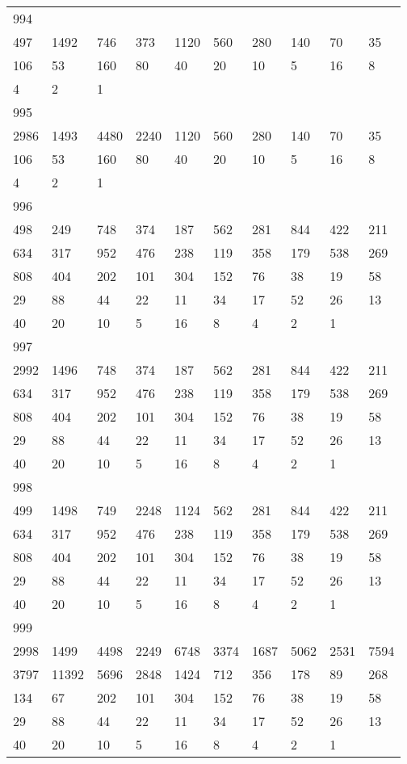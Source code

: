 \begin{longtable}{*{10}{l}}
994&&&&&&&&&\\
497& 1492& 746& 373& 1120& 560& 280& 140& 70& 35\\
106& 53& 160& 80& 40& 20& 10& 5& 16& 8\\
4& 2& 1& \\

995&&&&&&&&&\\
2986& 1493& 4480& 2240& 1120& 560& 280& 140& 70& 35\\
106& 53& 160& 80& 40& 20& 10& 5& 16& 8\\
4& 2& 1& \\

996&&&&&&&&&\\
498& 249& 748& 374& 187& 562& 281& 844& 422& 211\\
634& 317& 952& 476& 238& 119& 358& 179& 538& 269\\
808& 404& 202& 101& 304& 152& 76& 38& 19& 58\\
29& 88& 44& 22& 11& 34& 17& 52& 26& 13\\
40& 20& 10& 5& 16& 8& 4& 2& 1& \\

997&&&&&&&&&\\
2992& 1496& 748& 374& 187& 562& 281& 844& 422& 211\\
634& 317& 952& 476& 238& 119& 358& 179& 538& 269\\
808& 404& 202& 101& 304& 152& 76& 38& 19& 58\\
29& 88& 44& 22& 11& 34& 17& 52& 26& 13\\
40& 20& 10& 5& 16& 8& 4& 2& 1& \\

998&&&&&&&&&\\
499& 1498& 749& 2248& 1124& 562& 281& 844& 422& 211\\
634& 317& 952& 476& 238& 119& 358& 179& 538& 269\\
808& 404& 202& 101& 304& 152& 76& 38& 19& 58\\
29& 88& 44& 22& 11& 34& 17& 52& 26& 13\\
40& 20& 10& 5& 16& 8& 4& 2& 1& \\

999&&&&&&&&&\\
2998& 1499& 4498& 2249& 6748& 3374& 1687& 5062& 2531& 7594\\
3797& 11392& 5696& 2848& 1424& 712& 356& 178& 89& 268\\
134& 67& 202& 101& 304& 152& 76& 38& 19& 58\\
29& 88& 44& 22& 11& 34& 17& 52& 26& 13\\
40& 20& 10& 5& 16& 8& 4& 2& 1& \\


\end{longtable}
